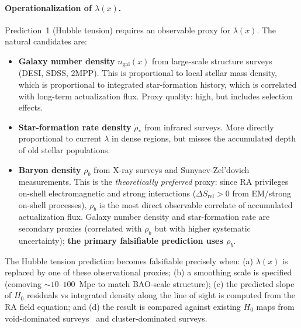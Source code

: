 \documentclass[11pt,a4paper]{article}
\theoremstyle{plain}
\theoremstyle{definition}
\theoremstyle{remark}
\begin{document}
\paragraph{Operationalization of $\lambda(x)$.}
Prediction~1 (Hubble tension) requires an observable proxy for $\lambda(x)$. The
natural candidates are:
\begin{itemize}[noitemsep]
  \item \textbf{Galaxy number density} $n_{\mathrm{gal}}(x)$ from large-scale
  structure surveys (DESI, SDSS, 2MPP). This is proportional to local stellar
  mass density, which is proportional to integrated star-formation history, which
  is correlated with long-term actualization flux. Proxy quality: high, but
  includes selection effects.
  \item \textbf{Star-formation rate density} $\dot{\rho}_*$ from infrared surveys.
  More directly proportional to current $\lambda$ in dense regions, but misses
  the accumulated depth of old stellar populations.
  \item \textbf{Baryon density} $\rho_b$ from X-ray surveys and Sunyaev-Zel'dovich
  measurements. This is the \emph{theoretically preferred} proxy: since RA
  privileges on-shell electromagnetic and strong interactions
  ($\Delta S_{\mathrm{rel}} > 0$ from EM/strong on-shell processes), $\rho_b$
  is the most direct observable correlate of accumulated actualization flux.
  Galaxy number density and star-formation rate are secondary proxies
  (correlated with $\rho_b$ but with higher systematic uncertainty);
  \textbf{the primary falsifiable prediction uses $\rho_b$}.
  \label{sec:proxies}
\end{itemize}
The Hubble tension prediction becomes falsifiable precisely when: (a) $\lambda(x)$
is replaced by one of these observational proxies; (b) a smoothing scale is
specified (comoving $\sim 10$--$100$~Mpc to match BAO-scale structure); (c) the
predicted slope of $H_0$ residuals vs integrated density along the line of sight
is computed from the RA field equation; and (d) the result is compared against
existing $H_0$ maps from void-dominated surveys~\citep{Kenworthy2019} and
cluster-dominated surveys.
\end{document}

